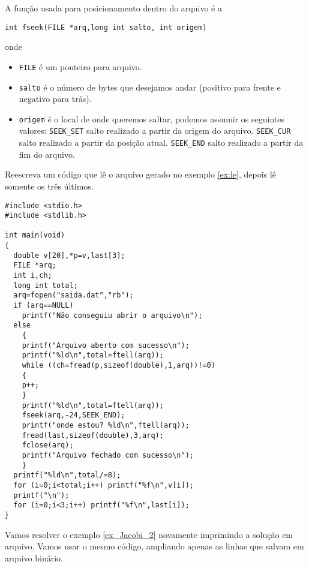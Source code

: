 A função usada para posicionamento dentro do arquivo é a 
\begin{verbatim}
int fseek(FILE *arq,long int salto, int origem)
\end{verbatim}
onde
\begin{itemize}
 \item \verb|FILE| é um ponteiro para arquivo.
 \item \verb|salto| é o número de bytes que desejamos andar (positivo para frente e negativo para trás).  
 \item \verb|origem| é o local de onde queremos saltar, podemos assumir os seguintes valores:
 \subitem \verb|SEEK_SET| salto realizado a partir da origem do arquivo.
 \subitem \verb|SEEK_CUR| salto realizado a partir da posição atual.
 \subitem \verb|SEEK_END| salto realizado a partir da fim do arquivo.
 \end{itemize}
\begin{ex}
Reescreva um código que lê o arquivo gerado no exemplo \ref{ex:le}, depois lê somente os três últimos.
\end{ex}
\begin{verbatim}
#include <stdio.h>
#include <stdlib.h>

int main(void)
{
  double v[20],*p=v,last[3];
  FILE *arq;
  int i,ch;
  long int total;
  arq=fopen("saida.dat","rb");
  if (arq==NULL) 
    printf("Não conseguiu abrir o arquivo\n");
  else 
    {
    printf("Arquivo aberto com sucesso\n");  
    printf("%ld\n",total=ftell(arq));
    while ((ch=fread(p,sizeof(double),1,arq))!=0)
    {
    p++;
    }
    printf("%ld\n",total=ftell(arq));
    fseek(arq,-24,SEEK_END);
    printf("onde estou? %ld\n",ftell(arq));
    fread(last,sizeof(double),3,arq);
    fclose(arq);
    printf("Arquivo fechado com sucesso\n");
    }
  printf("%ld\n",total/=8);
  for (i=0;i<total;i++) printf("%f\n",v[i]);
  printf("\n");
  for (i=0;i<3;i++) printf("%f\n",last[i]);
}
\end{verbatim}
\begin{ex}
Vamos resolver o exemplo \ref{ex_Jacobi_2} novamente imprimindo a solução em arquivo. Vamos usar o mesmo código, ampliando apenas as linhas que salvam em arquivo binário.
\end{ex}
